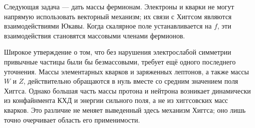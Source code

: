 Следующая задача — дать массы фермионам. Электроны и кварки не могут напрямую использовать векторный механизм; их связи с Хиггсом являются взаимодействиями Юкавы. Когда скалярное поле устанавливается на \(f\), эти взаимодействия становятся массовыми членами фермионов.

Широкое утверждение о том, что без нарушения электрослабой симметрии привычные частицы были бы безмассовыми, требует ещё одного последнего уточнения. Массы элементарных кварков и заряженных лептонов, а также массы \(W\) и \(Z\), действительно обращаются в нуль вместе со средним значением поля Хиггса. Однако большая часть массы протона и нейтрона возникает динамически из конфайнмента КХД и энергии сильного поля, а не из хиггсовских масс кварков. Это различие не меняет выведенный здесь механизм Хиггса; оно лишь точно очерчивает область его применимости.